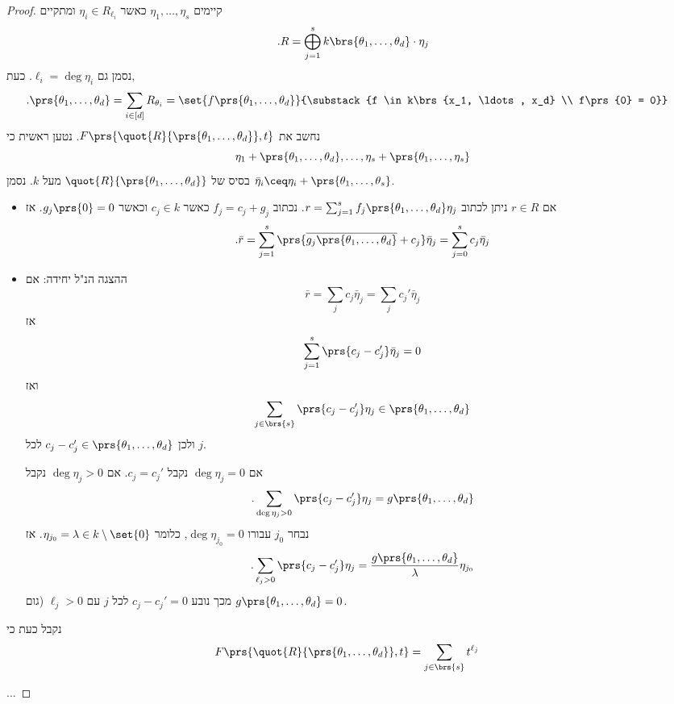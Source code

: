 \documentclass[10pt]{article}
\begin{document}
\begin{proof}
קיימים
$\eta_1, \ldots, \eta_s$
כאשר
$\eta_i \in R_{\ell_i}$
ומתקיים
\[\text{.} R = \bigoplus_{j=1}^s k\brs{\theta_1, \ldots, \theta_d} \cdot \eta_j\]
נסמן גם
$\ell_i = \deg \eta_i$.
כעת,
\begin{align*}
\text{.} \prs{\theta_1, \ldots, \theta_d} &= \sum_{i \in [d]} R_{\theta_i} = \set{f\prs{\theta_1, \ldots, \theta_d}}{\substack{f \in k\brs{x_1, \ldots, x_d} \\ f\prs{0} = 0}}
\end{align*}
נחשב את
$F\prs{\quot{R}{\prs{\theta_1, \ldots, \theta_d}}, t}$.
נטען ראשית כי
\[\eta_1 + \prs{\theta_1, \ldots, \theta_d}, \ldots, \eta_s + \prs{\theta_1, \ldots, \eta_s}\]
בסיס
של
$\quot{R}{\prs{\theta_1, \ldots, \theta_d}}$
מעל
$k$.
נסמן
$\bar{\eta}_i \ceq \eta_i + \prs{\theta_1, \ldots, \theta_s}$.

\begin{itemize}
\item אם
$r \in R$
ניתן לכתוב
$r = \sum_{j=1}^s f_j\prs{\theta_1 ,\ldots, \theta_d} \eta_j$.
נכתוב
$f_j = c_j + g_j$
כאשר
$c_j \in k$
וכאשר
$g_j\prs{0} = 0$.
אז
\begin{align*}
\text{.} \bar{r} = \sum_{j=1}^s \prs{\overline{g_j\prs{\theta_1, \ldots, \theta_d}} + c_j} \bar{\eta}_j = \sum_{j=0}^s c_j \bar{\eta}_j
\end{align*}

\item ההצגה הנ"ל יחידה:
אם
\[\bar{r} = \sum_j c_j \bar{\eta}_j = \sum_j c_j' \bar{\eta}_j\]
אז
\[\sum_{j=1}^s \prs{c_j - c'_j} \bar{\eta}_j = 0\]
ואז
\[\sum_{j \in \brs{s}} \prs{c_j - c_j'} \eta_j \in \prs{\theta_1 ,\ldots, \theta_d}\]
ולכן
$c_j - c_j' \in \prs{\theta_1 ,\ldots, \theta_d}$
לכל
$j$.

אם
$\deg \eta_j = 0$
נקבל
$c_j = c_j'$.
אם
$\deg \eta_j > 0$
נקבל
\[\text{.} \sum_{\deg \eta_j > 0} \prs{c_j - c_j'} \eta_j = g\prs{\theta_1, \ldots, \theta_d}\]
נבחר
$j_0$
עבורו
$\deg \eta_{j_0} = 0$,
כלומר
$\eta_{j_0} = \lambda \in k \setminus \set{0}$.
אז
\begin{align*}
\text{.} \sum_{\ell_j > 0} \prs{c_j - c_j'} \eta_j = \frac{g\prs{\theta_1 ,\ldots, \theta_d}}{\lambda} \eta_{j_0}
\end{align*}
מכך נובע
$c_j - c_j' = 0$
לכל
$j$
עם
$\ell_j > 0$
(גום
$g\prs{\theta_1, \ldots, \theta_d} = 0$.
\end{itemize}

נקבל כעת כי
\begin{align*}
F\prs{\quot{R}{\prs{\theta_1,\ldots, \theta_d}}, t} &= \sum_{j \in \brs{s}} t^{\ell_j}
\end{align*}

...
\end{proof}
\end{document}
